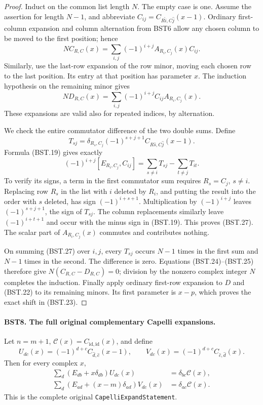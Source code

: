 \begin{proof}
Induct on the common list length $N$.  The empty case is one.
Assume the assertion for length $N-1$, and abbreviate
$C_{ij}=C_{R\widehat{i},C\widehat{j}}(x-1)$.
Ordinary first-column expansion and column alternation from BST6
allow any chosen column to be moved to the first position; hence
\[
 N C_{R,C}(x)=
       \sum_{i,j}(-1)^{i+j}A_{R_i,C_j}(x)C_{ij}.
 \tag{BST.24}
\]
Similarly, use the last-row expansion of the row minor, moving each
chosen row to the last position.  Its entry at that position has
parameter $x$.  The induction hypothesis on the remaining minor
gives
\[
 N D_{R,C}(x)=
       \sum_{i,j}(-1)^{i+j}C_{ij}A_{R_i,C_j}(x).
 \tag{BST.25}
\]
These expansions are valid also for repeated indices, by alternation.

We check the entire commutator difference of the two double sums.
Define
\[
 T_{sj}=\delta_{R_s,C_j}(-1)^{s+j+1}
                  C_{R\widehat{s},C\widehat{j}}(x-1).
 \tag{BST.26}
\]
Formula (BST.19) gives exactly
\[
 (-1)^{i+j}[E_{R_i,C_j},C_{ij}]
               =\sum_{s\ne i}T_{sj}-\sum_{t\ne j}T_{it}.
 \tag{BST.27}
\]
To verify its signs, a term in the first commutator sum requires
$R_s=C_j$, $s\ne i$.  Replacing row $R_s$ in the list with $i$
deleted by $R_i$, and putting the result into the order with $s$
deleted, has sign $(-1)^{i+s+1}$.  Multiplication by
$(-1)^{i+j}$ leaves $(-1)^{s+j+1}$, the sign of $T_{sj}$.
The column replacements similarly leave $(-1)^{i+t+1}$ and occur
with the minus sign in (BST.19).  This proves (BST.27).
The scalar part of $A_{R_i,C_j}(x)$ commutes and contributes nothing.

On summing (BST.27) over $i,j$, every $T_{sj}$ occurs $N-1$
times in the first sum and $N-1$ times in the second.  The
difference is zero.  Equations (BST.24)--(BST.25) therefore give
$N(C_{R,C}-D_{R,C})=0$; division by the nonzero complex integer
$N$ completes the induction.  Finally apply ordinary first-row
expansion to $D$ and (BST.22) to its remaining minors.  Its first
parameter is $x-p$, which proves the exact shift in (BST.23).
\end{proof}

\paragraph{BST8. The full original complementary Capelli expansions.}
\label{claim:BST8}
Let $n=m+1$, $\mathcal C(x)=C_{\mathrm{id},\mathrm{id}}(x)$,
and define
\[
 U_{dc}(x)=(-1)^{d+c}C_{\widehat d,\widehat c}(x-1),
 \qquad
 V_{dc}(x)=(-1)^{d+c}C_{\widehat c,\widehat d}(x).
 \tag{BST.28}
\]
Then for every complex $x$,
\[
 \begin{split}
 \sum_d(E_{db}+x\delta_{db})U_{dc}(x)
                         &=\delta_{bc}\mathcal C(x),\\
 \sum_d(E_{ad}+(x-m)\delta_{ad})V_{dc}(x)
                         &=\delta_{ac}\mathcal C(x).
 \end{split}
 \tag{BST.29}
\]
This is the complete original \texttt{CapelliExpandStatement}.

